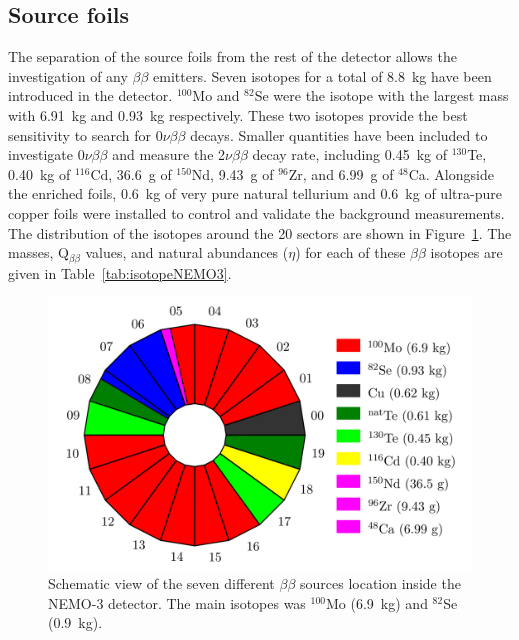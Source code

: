 \documentclass[main.tex]{subfiles}
\begin{document}
\FloatBarrier


\subsection{Source foils}


\NI The separation of the source foils from the rest of the detector allows the investigation of any $\beta\beta$ emitters. Seven isotopes for a total of 8.8~kg have been introduced in the detector. $^{\text{100}}$Mo and $^{\text{82}}$Se were the isotope with the largest mass with 6.91~kg and 0.93~kg respectively. These two isotopes provide the best sensitivity to search for 0$\nu\beta\beta$ decays. Smaller quantities have been included to investigate 0$\nu\beta\beta$ and measure the 2$\nu\beta\beta$ decay rate, including 0.45~kg of $^{\text{130}}$Te, 0.40~kg of $^{\text{116}}$Cd, 36.6~g of $^{\text{150}}$Nd, 9.43~g of $^{\text{96}}$Zr, and 6.99~g of $^{\text{48}}$Ca. Alongside the enriched foils, 0.6~kg of very pure natural tellurium and 0.6~kg of ultra-pure copper foils were installed to control and validate the background measurements. The distribution of the isotopes around the 20 sectors are shown in Figure~\ref{NEMO3Sector}. The masses, Q$_{\beta\beta}$ values, and natural abundances ($\eta$) for each of these $\beta\beta$ isotopes are given in Table~\ref{tab:isotopeNEMO3}.



\begin{figure}[h!]
\begin{center}
\includegraphics[scale=0.5]{pictures/Chap3/BBSourceDistribution.png}
\caption{Schematic view of the seven different $\beta\beta$ sources location inside the NEMO-3 detector. The main isotopes was $^{\text{100}}$Mo (6.9~kg) and $^{\text{82}}$Se (0.9~kg).}
\label{NEMO3Sector}
\end{center}
\end{figure}
\end{document}
